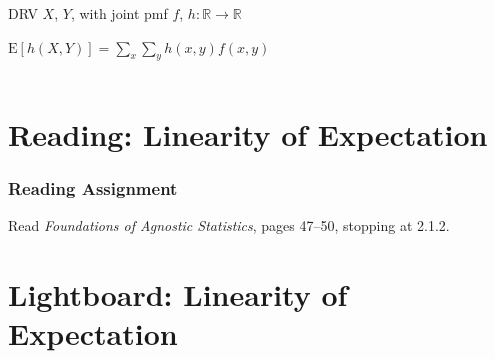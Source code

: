 \documentclass[12pt, block=fill]{beamer}
\newcommand{\E}{\text{E}}
\newcommand{\R}{\mathbb{R}}
\begin{document}
\begin{frame}[t]
\begin{columns}
\begin{column}{0.5\textwidth}
      DRV $X$, $Y$, with joint pmf $f$, $h: \R \rightarrow \R$
      
      $\E[h(X,Y)] = \sum_x \sum_y h(x,y) f(x,y)$
      
    \end{column}
  \end{columns}
\end{frame}

\section{Reading: Linearity of Expectation}

\begin{frame}
  \frametitle{Reading Assignment}
  Read \textit{Foundations of Agnostic Statistics}, pages 47–50,
  stopping at 2.1.2.
\end{frame}


\section{Lightboard: Linearity of Expectation}
\end{document}
